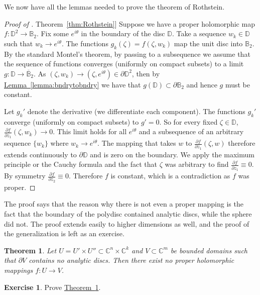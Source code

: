 \documentclass[12pt,openany]{book}
\newcommand{\C}{{\mathbb{C}}}
\newcommand{\D}{{\mathbb{D}}}
\newcommand{\bB}{{\mathbb{B}}}
\newcommand{\bD}{{\mathbb{D}}}
\theoremstyle{plain}
\newtheorem{thm}{Theorem}[section]
\theoremstyle{remark}
\theoremstyle{definition}
\newenvironment{exbox}{%
    \def\FrameCommand{\vrule width 1pt \relax\hspace {10pt}}%
    \MakeFramed {\advance \hsize -\width \FrameRestore }%
}{%
    \endMakeFramed
}
\theoremstyle{exercise}
\newtheorem{exercise}{Exercise}[section]
\theoremstyle{example}
\newcommand{\thmref}[1]{\hyperref[#1]{Theorem~\ref*{#1}}}
\newcommand{\lemmaref}[1]{\hyperref[#1]{Lemma~\ref*{#1}}}
\begin{document}
We now have all the lemmas needed to prove the theorem of Rothstein.

\begin{proof}[Proof of \thmref{thm:Rothstein}]
Suppose we have a proper holomorphic map $f \colon \D^2
\to \bB_2$.
Fix some $e^{i\theta}$ in the boundary of the disc $\bD$.  Take a sequence
$w_k \in \bD$ such that $w_k \to e^{i\theta}$.   The functions
$g_k(\zeta) =  f(\zeta,w_k)$ map the unit disc into $\bB_2$.  By the standard
Montel's theorem, by passing to a subsequence we assume that
the sequence of functions converges (uniformly on compact subsets) to
a limit $g \colon \bD \to \overline{\bB}_2$.  As $(\zeta,w_k) \to
(\zeta,e^{i\theta}) \in \partial \D^2$, then by
\lemmaref{lemma:bndrytobndry} we have that $g(\bD) \subset \partial \bB_2$
and hence $g$ must be constant.

Let $g_k'$ denote the derivative (we differentiate each component).
The functions $g_k'$ converge (uniformly on compact subsets)
to $g' = 0$. So for every fixed $\zeta \in \bD$,
$\frac{\partial f}{\partial z_1} (\zeta, w_k) \to 0$.
This limit holds for all $e^{i\theta}$ and a subsequence of
an arbitrary sequence $\{ w_k \}$ where $w_k \to e^{i\theta}$.  The mapping that takes $w$ to
$\frac{\partial f}{\partial z_1} (\zeta, w)$ therefore extends continuously
to $\partial \D$ and is zero on the boundary.
We apply the maximum
principle or the Cauchy formula and the fact that $\zeta$ was arbitrary to find 
$\frac{\partial f}{\partial z_1} \equiv 0$.  By symmetry
$\frac{\partial f}{\partial z_2} \equiv 0$.  Therefore $f$ is constant,
which is a contradiction as $f$ was proper.
\end{proof}

The proof says that the reason why there is not even a proper mapping is the fact
that the boundary of the polydisc contained analytic discs, while
the sphere did not.
The proof extends easily to higher dimensions as well, and the proof
of the generalization is left as an exercise.

\begin{thm} \label{thm:nopropmapprodandnodisc}
Let $U = U' \times U'' \subset \C^n \times \C^k$ and $V \subset \C^m$ be bounded
domains such that $\partial V$ contains no analytic discs.
Then there exist no proper
holomorphic mappings $f \colon U \to V$.
\end{thm}

\begin{exbox}
\begin{exercise}
Prove \thmref{thm:nopropmapprodandnodisc}.
\end{exercise}
\end{exbox}
\end{document}
